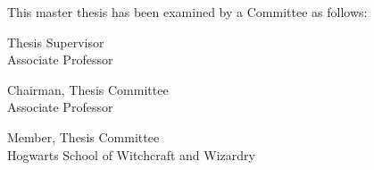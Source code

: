 \begin{titlepage}
\begin{large}
This master thesis has been examined by a Committee as follows:

\signature{Professor Silvio de Barros Melo}{Thesis Supervisor \\
   Associate Professor}

\signature{Professor Veronica Teichrieb}{Chairman, Thesis Committee \\
   Associate Professor}

\signature{Professor Alvo Dumbledore}{Member, Thesis Committee \\
   Hogwarts School of Witchcraft and Wizardry}
\end{large}
\end{titlepage}

